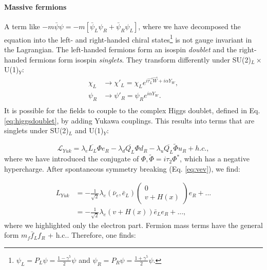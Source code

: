 \paragraph{Massive fermions}
A term like $-m\bar{\psi}\psi = -m\left[\bar{\psi}_L\psi_R + \bar{\psi}_R\psi_L\right]$, where we have decomposed the equation into the left- and right-handed chiral states\footnote{$\psi_L = P_L \psi = \frac{1-\gamma^5}{2} \psi$ and $\psi_R = P_R \psi = \frac{1+\gamma^5}{2} \psi$.} is not gauge invariant in the Lagrangian. The left-handed fermions form an isospin \textit{doublet} and the right-handed fermions form isospin \textit{singlets}. They transform differently under SU(2)$_L \times$ U(1)$_Y$:
\begin{equation}
\begin{split}
\chi_L &\rightarrow \chi'_L = \chi_L e^{i \vec{\tau_L} \vec{W}+i\alpha Y_W},\\
\psi_R &\rightarrow \psi'_R = \psi_R e^{i\alpha Y_W}.\\
\end{split}
\end{equation} 
It is possible for the fields to couple to the complex Higgs doublet, defined in Eq. \ref{eq:higgsdoublet}, by adding Yukawa couplings. This results into terms that are singlets under SU(2)$_L$ and U(1)$_Y$:

\begin{equation}
\label{eq:yukawa}
\mathcal{L}_{Yuk} = \lambda_e \overline{L_L}\Phi e_R - \lambda_d \overline{Q_L} \Phi d_R - \lambda_u \overline{Q_L} \tilde{\Phi}u_R + h.c.,
\end{equation}
where we have introduced the conjugate of $\Phi,\tilde{\Phi} = i\tau_2 \Phi^*$, which has a negative hypercharge. After spontaneous symmetry breaking (Eq. \ref{eq:vev}), we find:

\begin{equation}
\begin{split}
L_{Yuk} &= -\frac{1}{\sqrt{2}} \lambda_e \left(\bar{\nu}_e, \bar{e}_L\right) \begin{pmatrix} 0 \\ v+H(x) \end{pmatrix} e_R + ... \\
\ &= -\frac{1}{\sqrt{2}} \lambda_e \left(v+H(x)\right)\bar{e}_L e_R + ...,
\end{split}
\end{equation}
where we highlighted only the electron part. Fermion mass terms have the general form $m_f \bar{f}_L f_R$ + h.c.. Therefore, one finds:

